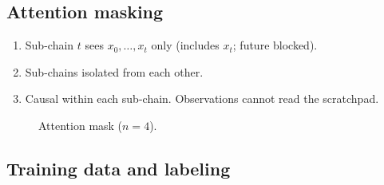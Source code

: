 \subsection{Attention masking}

\begin{enumerate}
    \item Sub-chain $t$ sees $x_0, \ldots, x_t$ only (includes $x_t$; future blocked).
    \item Sub-chains isolated from each other.
    \item Causal within each sub-chain. Observations cannot read the scratchpad.
\end{enumerate}

\begin{figure}[h]
\centering
{}
\caption{Attention mask ($n=4$).}
\label{fig:mask}
\end{figure}

\subsection{Training data and labeling}


